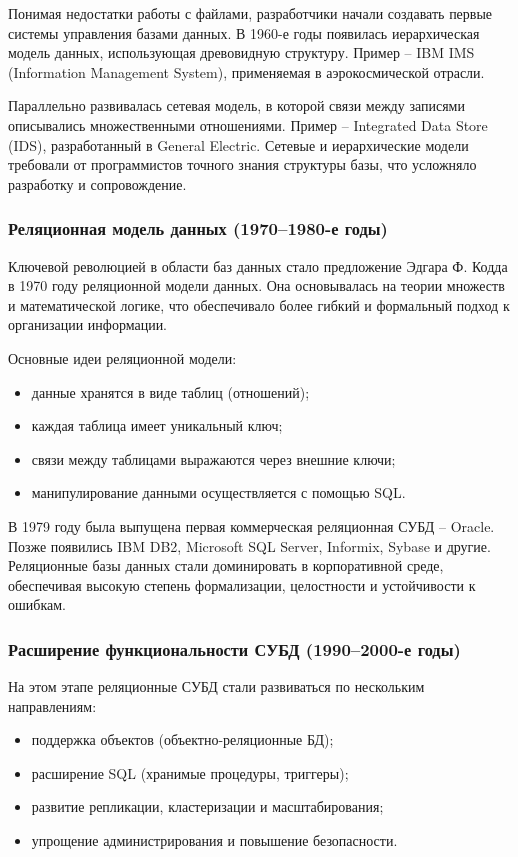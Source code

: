 Понимая недостатки работы с файлами, разработчики начали создавать первые системы управления базами данных. В 1960-е годы появилась иерархическая модель данных, использующая древовидную структуру. Пример -- IBM IMS (Information Management System), применяемая в аэрокосмической отрасли.

Параллельно развивалась сетевая модель, в которой связи между записями описывались множественными отношениями. Пример -- Integrated Data Store (IDS), разработанный в General Electric. Сетевые и иерархические модели требовали от программистов точного знания структуры базы, что усложняло разработку и сопровождение.

\subsubsection{Реляционная модель данных (1970--1980-е годы)}

Ключевой революцией в области баз данных стало предложение Эдгара Ф. Кодда в 1970 году реляционной модели данных. Она основывалась на теории множеств и математической логике, что обеспечивало более гибкий и формальный подход к организации информации.

Основные идеи реляционной модели:
\begin{itemize}
	\item данные хранятся в виде таблиц (отношений);
	\item каждая таблица имеет уникальный ключ;
	\item связи между таблицами выражаются через внешние ключи;
	\item манипулирование данными осуществляется с помощью SQL.
\end{itemize}

В 1979 году была выпущена первая коммерческая реляционная СУБД -- Oracle. Позже появились IBM DB2, Microsoft SQL Server, Informix, Sybase и другие. Реляционные базы данных стали доминировать в корпоративной среде, обеспечивая высокую степень формализации, целостности и устойчивости к ошибкам.

\subsubsection{Расширение функциональности СУБД (1990--2000-е годы)}

На этом этапе реляционные СУБД стали развиваться по нескольким направлениям:
\begin{itemize}
	\item поддержка объектов (объектно-реляционные БД);
	\item расширение SQL (хранимые процедуры, триггеры);
	\item развитие репликации, кластеризации и масштабирования;
	\item упрощение администрирования и повышение безопасности.
\end{itemize}

